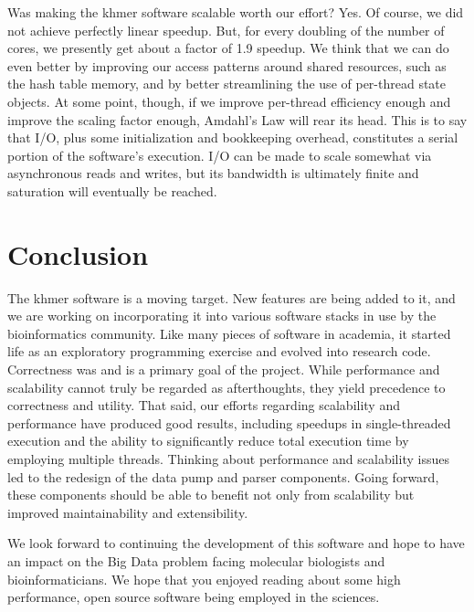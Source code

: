 \documentclass{article}
\begin{document}
Was making the khmer software scalable worth our effort? Yes. Of course, we did not achieve perfectly linear speedup. But, for every doubling of the number of cores, we presently get about a factor of 1.9 speedup. We think that we can do even better by improving our access patterns around shared resources, such as the hash table memory, and by better streamlining the use of per-thread state objects. At some point, though, if we improve per-thread efficiency enough and improve the scaling factor enough, Amdahl's Law will rear its head. This is to say that I/O, plus some initialization and bookkeeping overhead, constitutes a serial portion of the software's execution. I/O can be made to scale somewhat via asynchronous reads and writes, but its bandwidth is ultimately finite and saturation will eventually be reached.


\section{Conclusion}

The khmer software is a moving target. New features are being added to it, and we are working on incorporating it into various software stacks in use by the bioinformatics community. Like many pieces of software in academia, it started life as an exploratory programming exercise and evolved into research code. Correctness was and is a primary goal of the project. While performance and scalability cannot truly be regarded as afterthoughts, they yield precedence to correctness and utility. That said, our efforts regarding scalability and performance have produced good results, including speedups in single-threaded execution and the ability to significantly reduce total execution time by employing multiple threads. Thinking about performance and scalability issues led to the redesign of the data pump and parser components. Going forward, these components should be able to benefit not only from scalability but improved maintainability and extensibility.

We look forward to continuing the development of this software and hope to have an impact on the Big Data problem facing molecular biologists and bioinformaticians. We hope that you enjoyed reading about some high performance, open source software being employed in the sciences.



\end{document}
